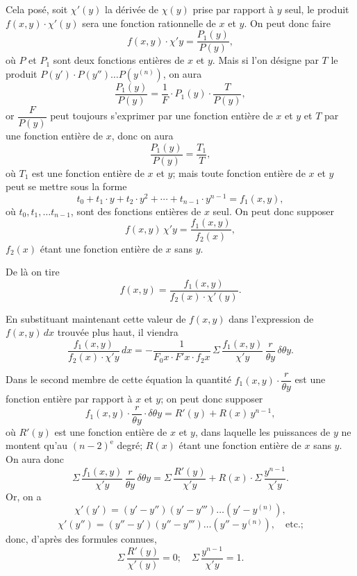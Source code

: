 \documentclass{article}
\begin{document}
Cela posé, soit $\chi'(y)$ la dérivée de $\chi(y)$ prise par rapport à $y$ seul, le produit $f(x, y) \cdot \chi'(y)$ sera une fonction rationnelle de $x$ et $y$. On peut donc faire
\[ f(x, y) \cdot \chi' y = \frac{P_1(y)}{P(y)}, \]
où $P$ et $P_1$ sont deux fonctions entières de $x$ et $y$. Mais si l'on désigne par $T$ le produit $P(y') \cdot P(y'') \ldots P(y^{(n)})$, on aura
\[ \frac{P_1(y)}{P(y)} = \frac{1}{F} \cdot P_1(y) \cdot \frac{T}{P(y)}, \]
or $\dfrac{F}{P(y)}$ peut toujours s'exprimer par une fonction entière de $x$ et $y$ et $T$ par une fonction entière de $x$, donc on aura
\[ \frac{P_1(y)}{P(y)} = \frac{T_1}{T}, \]
où $T_1$ est une fonction entière de $x$ et $y$; mais toute fonction entière de $x$ et $y$ peut se mettre sous la forme
\[ t_0 + t_1 \cdot y + t_2 \cdot y^{2} + \cdots + t_{n-1} \cdot y^{n-1} = f_1(x, y), \tag{16} \]
où $t_0, t_1, \ldots t_{n-1}$, sont des fonctions entières de $x$ seul. On peut donc supposer
\[ f(x, y)\,\chi' y = \frac{f_1(x, y)}{f_2(x)}, \]
$f_2(x)$ étant une fonction entière de $x$ sans $y$.

De là on tire
\[ f(x, y) = \frac{f_1(x, y)}{f_2(x) \cdot \chi'(y)}. \tag{17} \]

En substituant maintenant cette valeur de $f(x, y)$ dans l'expression de $f(x, y)\,dx$ trouvée plus haut, il viendra
\[ \frac{f_1(x, y)}{f_2(x) \cdot \chi' y}\,dx = -\frac{1}{F_0 x \cdot F' x \cdot f_2 x}\,\Sigma\,\frac{f_1(x, y)}{\chi' y}\,\frac{r}{\theta y}\,\delta\theta y. \tag{18} \]

Dans le second membre de cette équation la quantité $f_1(x, y) \cdot \dfrac{r}{\theta y}$ est une fonction entière par rapport à $x$ et $y$; on peut donc supposer
\[ f_1(x, y) \cdot \frac{r}{\theta y} \cdot \delta\theta y = R'(y) + R(x)\,y^{n-1}, \]
où $R'(y)$ est une fonction entière de $x$ et $y$, dans laquelle les puissances de $y$ ne montent qu'au $(n-2)^{\text{e}}$ degré; $R(x)$ étant une fonction entière de $x$ sans $y$. On aura donc
\[ \Sigma\,\frac{f_1(x, y)}{\chi' y}\,\frac{r}{\theta y}\,\delta\theta y = \Sigma\,\frac{R'(y)}{\chi' y} + R(x) \cdot \Sigma\,\frac{y^{n-1}}{\chi' y}. \]
Or, on a
\[ \chi'(y') = (y'-y'')(y'-y''') \ldots (y'-y^{(n)}), \]
\[ \chi'(y'') = (y''-y')(y''-y''') \ldots (y''-y^{(n)}), \quad \text{etc.;} \]
donc, d'après des formules connues,
\[ \Sigma\,\frac{R'(y)}{\chi'(y)} = 0; \quad \Sigma\,\frac{y^{n-1}}{\chi' y} = 1. \]
\end{document}
